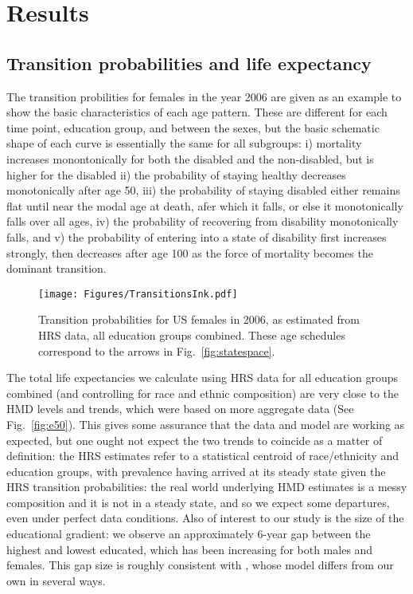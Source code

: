 \section{Results}
\label{sec:results}
\subsection{Transition probabilities and life expectancy}
The transition probilities for females in the year 2006 are given as an example to show the basic characteristics of each age pattern. These are different for each time point, education group, and between the sexes, but the basic schematic shape of each curve is essentially the same for all subgroups: i) mortality increases monontonically for both the disabled and the non-disabled, but is higher for the disabled ii) the probability of staying healthy decreases monotonically after age 50, iii) the probability of staying disabled either remains flat until near the modal age at death, afer which it falls, or else it monotonically falls over all ages, iv) the probability of recovering from disability monotonically falls, and v) the probability of entering into a state of disability first increases strongly, then decreases after age 100 as the force of mortality becomes the dominant transition. 

\begin{figure}[ht!]
\centering
\texttt{[image: Figures/TransitionsInk.pdf]}
\caption{Transition probabilities for US females in 2006, as estimated from HRS data, all education groups combined. These age schedules correspond to the arrows in Fig.~\ref{fig:statespace}.}
\end{figure}

The total life expectancies we calculate using HRS data for all education groups combined (and controlling for race and ethnic composition) are very close to the HMD levels and trends, which were based on more aggregate data (See Fig.~\ref{fig:e50}). This gives some assurance that the data and model are working as expected, but one ought not expect the two trends to coincide as a matter of definition: the HRS estimates refer to a statistical centroid of race/ethnicity and education groups, with prevalence having arrived at its steady state given the HRS transition probabilities: the real world underlying HMD estimates is a messy composition and it is not in a steady state, and so we expect some departures, even under perfect data conditions. Also of interest to our study is the size of the educational gradient: we observe an approximately 6-year gap between the highest and lowest educated, which has been increasing for both males and females. This gap size is roughly consistent with \citet{montez2014cumulative}, whose model differs from our own in several ways.

